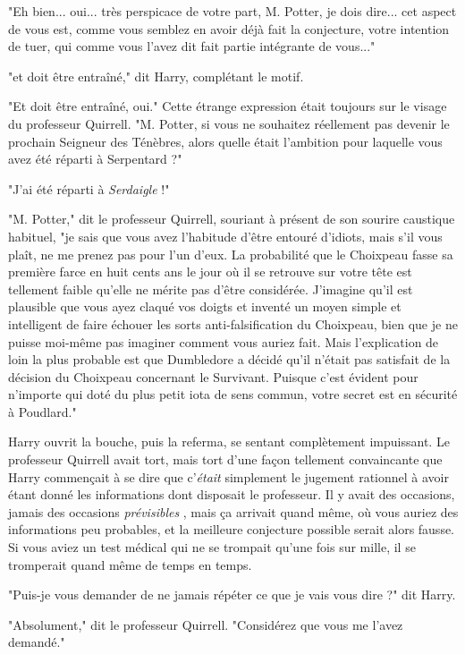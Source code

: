 "Eh bien... oui... très perspicace de votre part, M. Potter, je dois dire... cet aspect de vous est, comme vous semblez en avoir déjà fait la conjecture, votre intention de tuer, qui comme vous l'avez dit fait partie intégrante de vous..."

"et doit être entraîné," dit Harry, complétant le motif.

"Et doit être entraîné, oui." Cette étrange expression était toujours sur le visage du professeur Quirrell. "M. Potter, si vous ne souhaitez réellement pas devenir le prochain Seigneur des Ténèbres, alors quelle était l'ambition pour laquelle vous avez été réparti à Serpentard ?"

"J'ai été réparti à \emph{Serdaigle}  !"

"M. Potter," dit le professeur Quirrell, souriant à présent de son sourire caustique habituel, "je sais que vous avez l'habitude d'être entouré d'idiots, mais s'il vous plaît, ne me prenez pas pour l'un d'eux. La probabilité que le Choixpeau fasse sa première farce en huit cents ans le jour où il se retrouve sur votre tête est tellement faible qu'elle ne mérite pas d'être considérée. J'imagine qu'il est plausible que vous ayez claqué vos doigts et inventé un moyen simple et intelligent de faire échouer les sorts anti-falsification du Choixpeau, bien que je ne puisse moi-même pas imaginer comment vous auriez fait. Mais l'explication de loin la plus probable est que Dumbledore a décidé qu'il n'était pas satisfait de la décision du Choixpeau concernant le Survivant. Puisque c'est évident pour n'importe qui doté du plus petit iota de sens commun, votre secret est en sécurité à Poudlard."

Harry ouvrit la bouche, puis la referma, se sentant complètement impuissant. Le professeur Quirrell avait tort, mais tort d'une façon tellement convaincante que Harry commençait à se dire que c'\emph{était}  simplement le jugement rationnel à avoir étant donné les informations dont disposait le professeur. Il y avait des occasions, jamais des occasions \emph{prévisibles} , mais ça arrivait quand même, où vous auriez des informations peu probables, et la meilleure conjecture possible serait alors fausse. Si vous aviez un test médical qui ne se trompait qu'une fois sur mille, il se tromperait quand même de temps en temps.

"Puis-je vous demander de ne jamais répéter ce que je vais vous dire ?" dit Harry.

"Absolument," dit le professeur Quirrell. "Considérez que vous me l'avez demandé."

